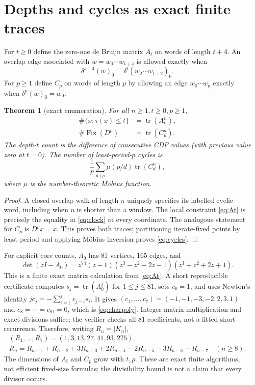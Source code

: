 \documentclass[a4paper,10pt]{amsart}
\newtheorem{theorem}{Theorem}[section]
\theoremstyle{remark}
\newcommand{\tr}{\operatorname{tr}}
\newcommand{\Fix}{\operatorname{Fix}}
\begin{document}
\section{Depths and cycles as exact finite traces}
For $t\ge0$ define the zero-one de Bruijn matrix $A_t$ on words of length
$t+4$. An overlap edge associated with $w=w_0\cdots w_{t+4}$ is allowed
exactly when
\begin{equation}\label{eq:At}
\delta^{t+4}(w)_0=\delta^t(w_2\cdots w_{t+2})_0.
\end{equation}
For $p\ge1$ define $C_p$ on words of length $p$ by allowing an edge
$w_0\cdots w_p$ exactly when $\delta^p(w)_0=w_0$.

\begin{theorem}[exact enumeration]\label{thm:trace}
For all $n\ge1,t\ge0,p\ge1$,
\begin{align}
\#\{x:\tau(x)\le t\}&=\tr(A_t^n),\label{eq:cdf}\\
\#\Fix(D^p)&=\tr(C_p^n).\label{eq:fix}
\end{align}
The depth-$t$ count is the difference of consecutive CDF values (with
previous value zero at $t=0$). The number of least-period-$p$ cycles is
\begin{equation}\label{eq:cycles}
\frac1p\sum_{d\mid p}\mu(p/d)\tr(C_d^n),
\end{equation}
where $\mu$ is the number-theoretic M\"obius function.
\end{theorem}
\begin{proof}
A closed overlap walk of length $n$ uniquely specifies its labelled
cyclic word, including when $n$ is shorter than a window. The local
constraint \eqref{eq:At} is precisely the equality in \eqref{eq:clock}
at every coordinate. The analogous statement for $C_p$ is $D^px=x$.
This proves both traces; partitioning iterate-fixed points by least
period and applying M\"obius inversion proves \eqref{eq:cycles}.
\end{proof}

For explicit core counts, $A_0$ has 81 vertices, 165 edges, and
\begin{equation}\label{eq:charpoly}
\det(zI-A_0)=z^{74}(z-1)(z^3-z^2-2z-1)(z^3+z^2+2z+1).
\end{equation}
This is a finite exact matrix calculation from \eqref{eq:At}. A short
reproducible certificate computes $s_j=\tr(A_0^j)$ for $1\le j\le81$,
sets $c_0=1$, and uses Newton's identity
$jc_j=-\sum_{i=1}^j c_{j-i}s_i$.
It gives $(c_1,\ldots,c_7)=(-1,-1,-3,-2,2,3,1)$ and
$c_8=\cdots=c_{81}=0$, which is \eqref{eq:charpoly}. Integer matrix
multiplication and exact divisions suffice; the verifier checks all 81
coefficients, not a fitted short recurrence. Therefore, writing $R_n=|K_n|$,
\begin{gather*}
(R_1,\ldots,R_7)=(1,3,13,27,41,93,225),\\
R_n=R_{n-1}+R_{n-2}+3R_{n-3}+2R_{n-4}
-2R_{n-5}-3R_{n-6}-R_{n-7}\quad(n\ge8).
\end{gather*}
The dimensions of $A_t$ and $C_p$ grow with $t,p$. These are exact
finite algorithms, not efficient fixed-size formulas; the divisibility
bound is not a claim that every divisor occurs.
\end{document}
